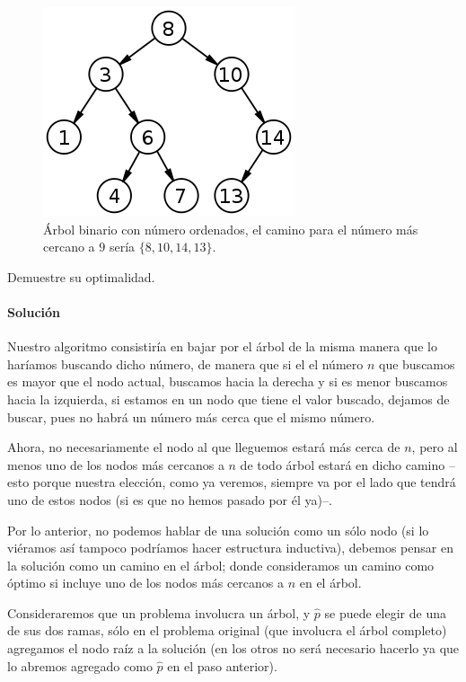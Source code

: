 \documentclass[spanish, fleqn]{article}
\begin{document}
\begin{enumerate}
\begin{figure}[H]
\centering
\includegraphics[scale=0.5]{arbol}
\caption{Árbol binario con número ordenados, el camino para el número más cercano a $9$ sería $\{8,10,14,13\}$.}
\end{figure}

Demuestre su optimalidad.

\paragraph{Solución} Nuestro algoritmo consistiría en bajar por el árbol de la misma manera que lo haríamos buscando dicho número, de manera que si el el número $n$ que buscamos es mayor que el nodo actual, buscamos hacia la derecha y si es menor buscamos hacia la izquierda, si estamos en un nodo que tiene el valor buscado, dejamos de buscar, pues no habrá un número más cerca que el mismo número.

Ahora, no necesariamente el nodo al que lleguemos estará más cerca de $n$, pero al menos uno de los nodos más cercanos a $n$ de todo árbol estará en dicho camino --esto porque nuestra elección, como ya veremos, siempre va por el lado que tendrá uno de estos nodos (si es que no hemos pasado por él ya)--.

Por lo anterior, no podemos hablar de una solución como un sólo nodo (si lo viéramos así tampoco podríamos hacer estructura inductiva), debemos pensar en la solución como un camino en el árbol; donde consideramos un camino como óptimo si incluye uno de los nodos más cercanos a $n$ en el árbol.

Consideraremos que un problema involucra un árbol, y $\hat{p}$ se puede elegir de una de sus dos ramas, sólo en el problema original (que involucra el árbol completo) agregamos el nodo raíz a la solución (en los otros no será necesario hacerlo ya que lo abremos agregado como $\hat{p}$ en el paso anterior).


\end{enumerate}
\end{document}
